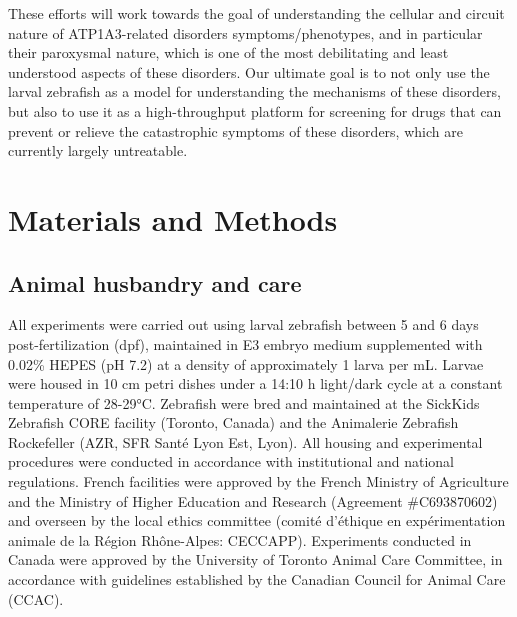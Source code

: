 \documentclass[9.5pt,lineno]{RandlettLab_elife}
\begin{document}
These efforts will work towards the goal of understanding the cellular and circuit nature of ATP1A3-related disorders symptoms/phenotypes, and in particular their paroxysmal nature, which is one of the most debilitating and least understood aspects of these disorders. Our ultimate goal is to not only use the larval zebrafish as a model for understanding the mechanisms of these disorders, but also to use it as a high-throughput platform for screening for drugs that can prevent or relieve the catastrophic symptoms of these disorders, which are currently largely untreatable.



\section{Materials and Methods}

\subsection{Animal husbandry and care}
All experiments were carried out using larval zebrafish between 5 and 6 days post-fertilization (dpf), maintained in E3 embryo medium supplemented with 0.02\% HEPES (pH 7.2) at a density of approximately 1 larva per mL.
Larvae were housed in 10 cm petri dishes under a 14:10 h light/dark cycle at a constant temperature of 28-29°C.
Zebrafish were bred and maintained at the SickKids Zebrafish CORE facility (Toronto, Canada) and the Animalerie Zebrafish Rockefeller (AZR, SFR Santé Lyon Est, Lyon).
All housing and experimental procedures were conducted in accordance with institutional and national regulations.
French facilities were approved by the French Ministry of Agriculture and the Ministry of Higher Education and Research (Agreement \#C693870602) and overseen by the local ethics committee (comité d’éthique en expérimentation animale de la Région Rhône-Alpes: CECCAPP).
Experiments conducted in Canada were approved by the University of Toronto Animal Care Committee, in accordance with guidelines established by the Canadian Council for Animal Care (CCAC).
\end{document}
